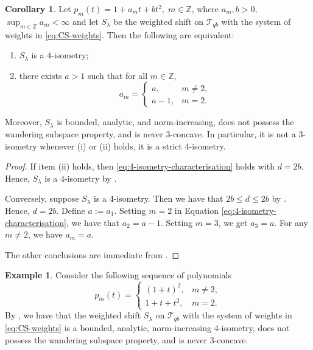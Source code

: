 \documentclass[11pt, reqno, a4paper]{amsart}
\theoremstyle{definition}
\newtheorem{example}[theorem]{Example}
\newtheorem{corollary}[theorem]{Corollary}
\newcommand{\scrT}{{\mathscr T}}
\renewcommand{\le}{\leqslant}
\newcommand{\Z}{\mathbb Z}
\numberwithin{equation}{section}
\begin{document}
    \begin{corollary}
        \label{cor:classify-4-isometries}
        Let $p_m (t) =  1 + a_m t + b t^2, \; m \in \Z$, where $a_m, b > 0$, $\sup_{m \in \Z} a_m < \infty$ and let $S_\lambda$ be the weighted shift on $\scrT_{qb}$ with the system of weights in \eqref{eq:CS-weights}. Then the following are equivalent:
        \begin{enumerate}
            \item[(i)] $S_{\lambda}$ is a $4$-isometry;
            \item[(ii)] there exists $a > 1$ such that for all $m \in \Z$,
            \begin{equation*}
                a_m = \begin{cases}
                    a, & m \ne 2, \\
                    a-1, & m = 2.
                \end{cases}
                \label{eq:almost-constant-a}
            \end{equation*}
        \end{enumerate}
        Moreover, $S_{\lambda}$ is bounded, analytic, and norm-increasing, does not possess the wandering subspace property, and is never $3$-concave. In particular, it is not a $3$-isometry whenever (i) or (ii) holds, it is a strict $4$-isometry.
    \end{corollary}
    \begin{proof}
        If item (ii) holds, then \eqref{eq:4-isometry-characterisation} holds with $d=2b$. Hence, $S_\lambda$ is a $4$-isometry by .

        Conversely, suppose $S_{\lambda}$ is a 4-isometry. Then we have that $2b \le d \le 2b$ by . Hence, $d=2b$. Define $a := a_1$. Setting $m=2$ in  Equation \eqref{eq:4-isometry-characterisation}, we have that $a_2 = a-1$. Setting $m=3$, we get $a_3 = a$. For any $m \ne 2$, we have $a_m = a$.

        The other conclusions are immediate from .
    \end{proof}

    \begin{example}
        Consider the following sequence of polynomials
        \begin{equation*}
            p_m (t) = \begin{cases}
                (1+t)^2, & m\ne 2, \\
                1+t+t^2, & m = 2.
            \end{cases}
        \end{equation*}
        By , we have that the weighted shift $S_{\lambda}$ on $\scrT_{qb}$ with the system of weights in \eqref{eq:CS-weights} is a bounded, analytic, norm-increasing $4$-isometry, does not possess the wandering subspace property, and is never $3$-concave.
    \end{example}
\end{document}
